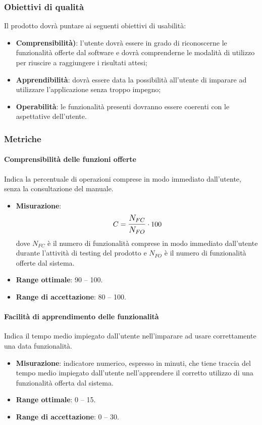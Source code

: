 \subsubsection{Obiettivi di qualità}
Il prodotto dovrà puntare ai seguenti obiettivi di usabilità:
\begin{itemize}
\item \textbf{Comprensibilità)}: l'utente dovrà essere in grado di riconoscerne le funzionalità offerte dal software e dovrà comprenderne le modalità di utilizzo per riuscire a raggiungere i risultati attesi;
\item \textbf{Apprendibilità}: dovrà essere data la possibilità all'utente di imparare ad utilizzare l'applicazione senza troppo impegno;
\item \textbf{Operabilità}: le funzionalità presenti dovranno essere coerenti con le aspettative dell'utente.
\end{itemize}

\subsubsection{Metriche}
\paragraph{Comprensibilità delle funzioni offerte}
Indica la percentuale di operazioni comprese in modo immediato dall'utente, senza la consultazione del manuale.
\begin{itemize}
	\item \textbf{Misurazione}: 
		$$C=\mathlarger{\frac{N_{FC}}{N_{FO}}} \cdot 100$$
	dove $N_{FC}$ è il numero di funzionalità comprese in modo immediato dall'utente durante l'attività di testing del prodotto e $N_{FO}$ è il numero di funzionalità offerte dal sistema.
	\item \textbf{Range ottimale}: 90 -- 100.
	\item \textbf{Range di accettazione}: 80 -- 100.
\end{itemize}

\paragraph{Facilità di apprendimento delle funzionalità}
Indica il tempo medio impiegato dall'utente nell'imparare ad usare correttamente una data funzionalità.
\begin{itemize}
	\item \textbf{Misurazione}: indicatore numerico, espresso in minuti, che tiene traccia del tempo medio impiegato dall'utente nell'apprendere il corretto utilizzo di una funzionalità offerta dal sistema.
	\item \textbf{Range ottimale}: 0 -- 15.
	\item \textbf{Range di accettazione}: 0 -- 30.
\end{itemize}


